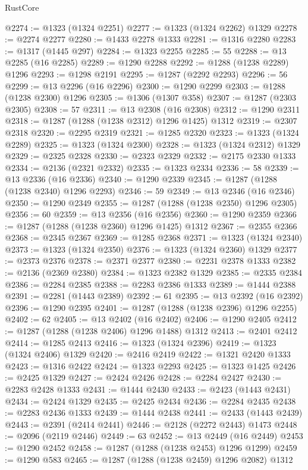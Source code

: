 \begin{lexlean}{RustCore}
\begin{coremodule}
@2274 := @1323 (@1324 @2251)
@2277 := @1323 (@1324 @2262) @1329
@2278 := @2274 @2277
@2280 := @1433 @2278 @1333
@2281 := @1316 @2280
@2283 := @1317 (@1445 @297)
@2284 := @1323 @2255
@2285 := 55
@2288 := @13 @2285 (@16 @2285)
@2289 := @1290 @2288
@2292 := @1288 (@1238 @2289) @1296
@2293 := @1298 @2191
@2295 := @1287 (@2292 @2293)
@2296 := 56
@2299 := @13 @2296 (@16 @2296)
@2300 := @1290 @2299
@2303 := @1288 (@1238 @2300) @1296
@2305 := @1306 (@1307 @358)
@2307 := @1287 (@2303 @2305)
@2308 := 57
@2311 := @13 @2308 (@16 @2308)
@2312 := @1290 @2311
@2318 := @1287 (@1288 (@1238 @2312) @1296 @1425) @1312
@2319 := @2307 @2318
@2320 := @2295 @2319
@2321 := @1285 @2320
@2323 := @1323 (@1324 @2289)
@2325 := @1323 (@1324 @2300)
@2328 := @1323 (@1324 @2312) @1329
@2329 := @2325 @2328
@2330 := @2323 @2329
@2332 := @2175 @2330 @1333
@2334 := @2136 (@2321 @2332)
@2335 := @1323 @2334
@2336 := 58
@2339 := @13 @2336 (@16 @2336)
@2340 := @1290 @2339
@2345 := @1287 (@1288 (@1238 @2340) @1296 @2293)
@2346 := 59
@2349 := @13 @2346 (@16 @2346)
@2350 := @1290 @2349
@2355 := @1287 (@1288 (@1238 @2350) @1296 @2305)
@2356 := 60
@2359 := @13 @2356 (@16 @2356)
@2360 := @1290 @2359
@2366 := @1287 (@1288 (@1238 @2360) @1296 @1425) @1312
@2367 := @2355 @2366
@2368 := @2345 @2367
@2369 := @1285 @2368
@2371 := @1323 (@1324 @2340)
@2373 := @1323 (@1324 @2350)
@2376 := @1323 (@1324 @2360) @1329
@2377 := @2373 @2376
@2378 := @2371 @2377
@2380 := @2231 @2378 @1333
@2382 := @2136 (@2369 @2380)
@2384 := @1323 @2382 @1329
@2385 := @2335 @2384
@2386 := @2284 @2385
@2388 := @2283 @2386 @1333
@2389 := @1444 @2388
@2391 := @2281 (@1443 @2389)
@2392 := 61
@2395 := @13 @2392 (@16 @2392)
@2396 := @1290 @2395
@2401 := @1287 (@1288 (@1238 @2396) @1296 @2255)
@2402 := 62
@2405 := @13 @2402 (@16 @2402)
@2406 := @1290 @2405
@2412 := @1287 (@1288 (@1238 @2406) @1296 @1488) @1312
@2413 := @2401 @2412
@2414 := @1285 @2413
@2416 := @1323 (@1324 @2396)
@2419 := @1323 (@1324 @2406) @1329
@2420 := @2416 @2419
@2422 := @1321 @2420 @1333
@2423 := @1316 @2422
@2424 := @1323 @2293
@2425 := @1323 @1425
@2426 := @2425 @1329
@2427 := @2424 @2426
@2428 := @2284 @2427
@2430 := @2283 @2428 @1333
@2431 := @1444 @2430
@2433 := @2423 (@1443 @2431)
@2434 := @2424 @1329
@2435 := @2425 @2434
@2436 := @2284 @2435
@2438 := @2283 @2436 @1333
@2439 := @1444 @2438
@2441 := @2433 (@1443 @2439)
@2443 := @2391 (@2414 @2441)
@2446 := @2128 (@2272 @2443) @1473
@2448 := @2096 (@2119 @2446)
@2449 := 63
@2452 := @13 @2449 (@16 @2449)
@2453 := @1290 @2452
@2458 := @1287 (@1288 (@1238 @2453) @1296 @1299)
@2459 := @1290 @583
@2465 := @1287 (@1288 (@1238 @2459) @1296 @2082) @1312

\end{coremodule}
\end{lexlean}
